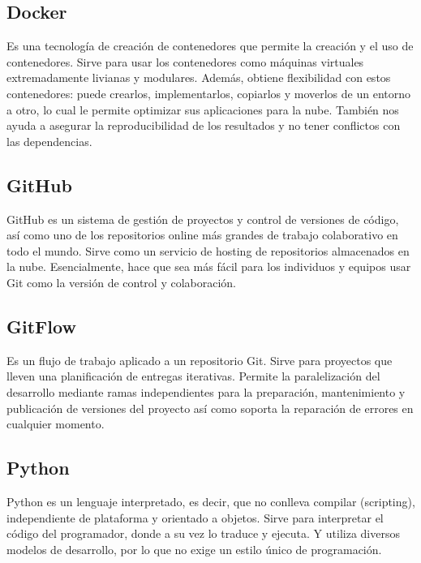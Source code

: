\documentclass[12pt,letterpaper]{article}
\begin{document}
\subsection*{Docker}
Es una tecnología de creación de contenedores que permite la creación y el uso
de contenedores. Sirve para usar los contenedores como máquinas
virtuales extremadamente livianas y modulares. Además, obtiene flexibilidad con
estos contenedores: puede crearlos, implementarlos, copiarlos y moverlos de un
entorno a otro, lo cual le permite optimizar sus aplicaciones para la nube.
\citep{redhat_docker}
También nos ayuda a asegurar la reproducibilidad de los resultados y no tener conflictos con las dependencias.

\subsection*{GitHub}
GitHub es un sistema de gestión de proyectos y control de versiones de código,
así como uno de los repositorios online más grandes de trabajo colaborativo en
todo el mundo.
\citep{hostinger_tutoriales_2019}
Sirve como un servicio de hosting de repositorios almacenados en la nube.
Esencialmente, hace que sea más fácil para los individuos y equipos usar Git
como la versión de control y colaboración.
\citep{kinsta_2020}

\subsection*{GitFlow}
Es un flujo de trabajo aplicado a un repositorio Git. Sirve para proyectos que
lleven una planificación de entregas iterativas. Permite la paralelización del
desarrollo mediante ramas independientes para la preparación, mantenimiento y
publicación de versiones del proyecto así como soporta la reparación de errores
en cualquier momento.
\citep{claventy_2020}

\subsection*{Python}
Python es un lenguaje interpretado, es decir, que no conlleva compilar
(scripting), independiente de plataforma y orientado a objetos. 
\citep{desarrollo_web_2003}
Sirve para interpretar el código del programador, donde a su vez lo traduce y
ejecuta. Y utiliza diversos modelos de desarrollo, por lo que no exige un estilo
único de programación.
\citep{angeles_2020}
\end{document}
